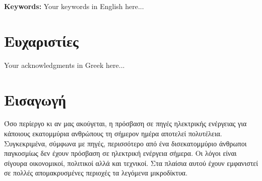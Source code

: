 \documentclass[a4paper,12pt]{report}
\newcommand{\gr}{\selectlanguage{greek}}  %
\begin{document}
\noindent\textbf{Keywords:} Your keywords in English here...

\newpage  %
\thispagestyle{empty}  %
\mbox{}  %

\gr
\chapter*{Ευχαριστίες}
Your acknowledgments in Greek here...

\newpage  %
\thispagestyle{empty}  %
\mbox{}  %

\tableofcontents

\newpage  %
\thispagestyle{empty}  %
\mbox{}  %

\listoffigures

\newpage  %
\thispagestyle{empty}  %
\mbox{}  %

\listoftables

\chapter*{Εισαγωγή}
Όσο περίεργο κι αν μας ακούγεται, η πρόσβαση σε πηγές ηλεκτρικής ενέργειας για κάποιους εκατομμύρια ανθρώπους τη σήμερον ημέρα αποτελεί πολυτέλεια. Συγκεκριμένα, σύμφωνα με πηγές, περισσότερο από ένα δισεκατομμύριο άνθρωποι παγκοσμίως δεν έχουν πρόσβαση σε ηλεκτρική ενέργεια σήμερα. 
Οι λόγοι είναι σίγουρα οικονομικοί, πολιτικοί αλλά και τεχνικοί. Στα πλαίσια αυτού έχουν εμφανιστεί σε πολλές απομακρυσμένες περιοχές τα λεγόμενα μικροδίκτυα. 

\clearpage
{}

 
  








 
 
\end{document}
